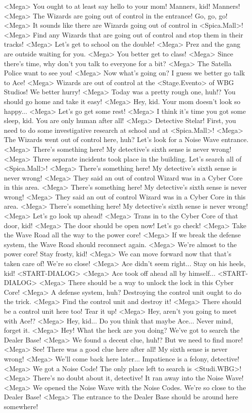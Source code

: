 <Mega> You ought to at least say hello to your mom! Manners, kid! Manners! 
<Mega> The Wizards are going out of control in the entrance! Go, go, go! 
<Mega> It sounds like there are Wizards going out of control in <Spica.Mall>! 
<Mega> Find any Wizards that are going out of control and stop them in their tracks! 
<Mega> Let's get to school on the double! 
<Mega> Prez and the gang are outside waiting for you. 
<Mega> You better get to class! 
<Mega> Since there's time, why don't you talk to everyone for a bit? 
<Mega> The Satella Police want to see you! 
<Mega> Now what's going on? I guess we better go talk to Ace! 
<Mega> Wizards are out of control at the <Stage.Evento> of WBG Studios! We better hurry! 
<Mega> Today was a pretty rough one, huh!? You should go home and take it easy! 
<Mega> Hey, kid. Your mom doesn't look so happy... 
<Mega> Let's go get some rest! 
<Mega> I think it's time you got some sleep, kid. You are only human after all! 
<Mega> Detective Stelar! First, you need to do some 
investigative research at school and at <Spica.Mall>! 
<Mega> The Wizards went out of control here, huh? Let's look for a Noise Wave entrance. 
<Mega> There's something here! My detective's sixth sense is never wrong! 
<Mega> Three separate incidents took place in the building. Let's search all of <Spica.Mall>! 
<Mega> There's something here! My detective's sixth sense is never wrong! 
<Mega> They said an out of control Wizard was in a Cyber Core in this area. 
<Mega> There's something here! My detective's sixth sense is never wrong! 
<Mega> They said an out of control Wizard was in a Cyber Core in this area. 
<Mega> There's something here! My detective's sixth sense is never wrong! 
<Mega> Let's go look up ahead! 
<Mega> Trans in to the Cyber Core of that door, kid! 
<Mega> The door should be open now! Let's go check! 
<Mega> Take the Wave Road all the way to the power core! 
<Mega> If we break the defense system, the Wave Road should reconnect again. 
<Mega> We're almost to the power core! Stay frosty, kid! 
<Mega> We can move forward now that that's taken care of! We're so close! 
<Mega> Ace didn't seem right... Stay on his heels, kid! 
<START-DIALOG>
<Mega> Ace took off ahead all by himself... 
<START-DIALOG>
<Mega> There should be a way to unlock the lock in this Cyber Core! 
<Mega> A defense system, huh? Destroying the control unit ought to do the trick. 
<Mega> Find the control unit and destroy it! 
<Mega> There should be a control unit here too! Tear it up! 
<Mega> Hey, aren't you going to meet with Ace!? 
<Mega> Hey, kid... Do you think that maybe Ace... Never mind, forget it. 
<Mega> Hey! What the heck are you doing? We've got to search the Dealer Base! 
<Mega> We found a decent clue, huh!? But we need to find more! 
<Mega> See! There was a good clue here after all! My sixth sense is never wrong! 
<Mega> We'll come back here later... Impatience is a felony, detective! 
<Mega> We got a Noise Code! The only place left to search is <Studi.WBG>! 
<Mega> There's no doubt about it, detective! It ran away into the Noise Wave! 
<Mega> We opened the Noise Wave with the Noise Codes. We're so close to the Dealer Base! 
<Mega> The entrance to the Dealer Base should be around here somewhere! 
